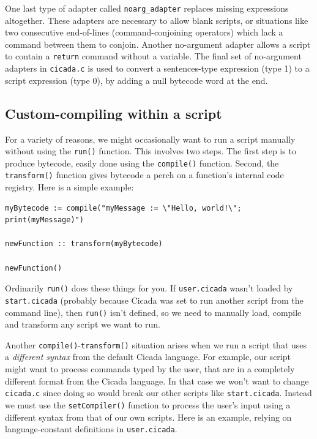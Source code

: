 \documentclass{article}
\newenvironment{code}{
       \begin{list}{}{
               \setlength{\leftmargin}{.4in}
               \setlength{\rightmargin}{0in}
               \setlength{\topsep}{.2in}
       }
       \small
       \item[] }
       { \end{list}   }
\begin{document}
One last type of adapter called \verb#noarg_adapter# replaces missing expressions altogether.  These adapters are necessary to allow blank scripts, or situations like two consecutive end-of-lines (command-conjoining operators) which lack a command between them to conjoin.  Another no-argument adapter allows a script to contain a \verb#return# command without a variable.  The final set of no-argument adapters in \verb#cicada.c# is used to convert a sentences-type expression (type 1) to a script expression (type 0), by adding a null bytecode word at the end.\\


 



\subsection{Custom-compiling within a script}

For a variety of reasons, we might occasionally want to run a script manually without using the \verb#run()# function.  This involves two steps.  The first step is to produce bytecode, easily done using the \verb#compile()# function.  Second, the \verb#transform()# function gives bytecode a perch on a function's internal code registry.  Here is a simple example:

\begin{code} \begin{verbatim}
myBytecode := compile("myMessage := \"Hello, world!\"; print(myMessage)")

newFunction :: transform(myBytecode)

newFunction()
\end{verbatim} \end{code}

\noindent Ordinarily \verb#run()# does these things for you.  If \verb#user.cicada# wasn't loaded by \verb#start.cicada# (probably because Cicada was set to run another script from the command line), then \verb#run()# isn't defined, so we need to manually load, compile and transform any script we want to run.

Another \verb#compile()#-\verb#transform()# situation arises when we run a script that uses a \emph{different syntax} from the default Cicada language.  For example, our script might want to process commands typed by the user, that are in a completely different format from the Cicada language.  In that case we won't want to change \verb#cicada.c# since doing so would break our other scripts like \verb#start.cicada#.  Instead we must use the \verb#setCompiler()# function to process the user's input using a different syntax from that of our own scripts.  Here is an example, relying on language-constant definitions in \verb#user.cicada#.
\end{document}
